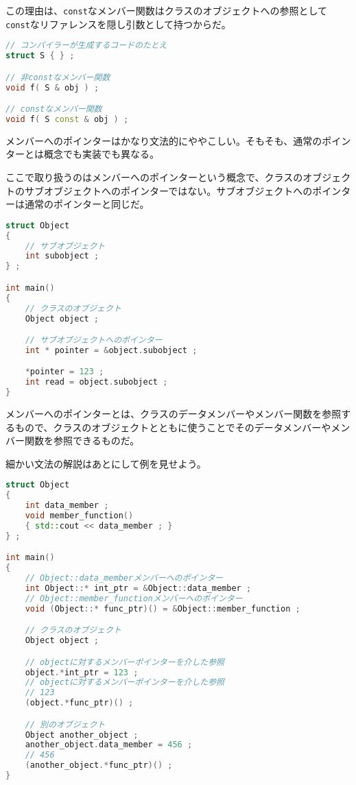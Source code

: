 この理由は、\texttt{const}なメンバー関数はクラスのオブジェクトへの参照として\texttt{const}なリファレンスを隠し引数として持つからだ。

\begin{lstlisting}[language={C++}]
// コンパイラーが生成するコードのたとえ
struct S { } ;

// 非constなメンバー関数
void f( S & obj ) ;

// constなメンバー関数
void f( S const & obj ) ;
\end{lstlisting}


メンバーへのポインターはかなり文法的にややこしい。そもそも、通常のポインターとは概念でも実装でも異なる。

ここで取り扱うのはメンバーへのポインターという概念で、クラスのオブジェクトのサブオブジェクトへのポインターではない。サブオブジェクトへのポインターは通常のポインターと同じだ。

\begin{lstlisting}[language={C++}]
struct Object
{
    // サブオブジェクト
    int subobject ;
} ;

int main()
{
    // クラスのオブジェクト
    Object object ;

    // サブオブジェクトへのポインター
    int * pointer = &object.subobject ;

    *pointer = 123 ;
    int read = object.subobject ;
}
\end{lstlisting}

メンバーへのポインターとは、クラスのデータメンバーやメンバー関数を参照するもので、クラスのオブジェクトとともに使うことでそのデータメンバーやメンバー関数を参照できるものだ。

細かい文法の解説はあとにして例を見せよう。

\ifTombow\pagebreak\fi
\begin{lstlisting}[language={C++}]
struct Object
{
    int data_member ;
    void member_function()
    { std::cout << data_member ; }
} ;

int main()
{
    // Object::data_memberメンバーへのポインター
    int Object::* int_ptr = &Object::data_member ;
    // Object::member_functionメンバーへのポインター
    void (Object::* func_ptr)() = &Object::member_function ;

    // クラスのオブジェクト
    Object object ;

    // objectに対するメンバーポインターを介した参照
    object.*int_ptr = 123 ;
    // objectに対するメンバーポインターを介した参照
    // 123
    (object.*func_ptr)() ;

    // 別のオブジェクト
    Object another_object ;
    another_object.data_member = 456 ;
    // 456
    (another_object.*func_ptr)() ;
}
\end{lstlisting}

